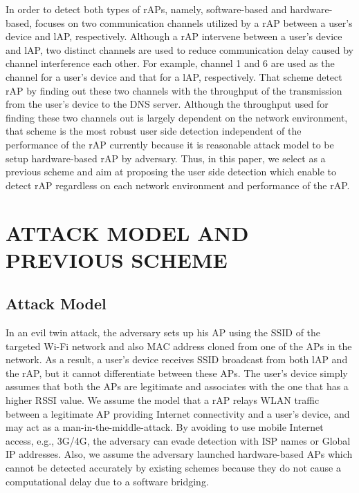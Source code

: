 \documentclass[conference]{IEEEtran}
\begin{document}
In order to detect both types of rAPs, namely, software-based and hardware-based, \cite{previous} focuses on two communication channels utilized by a rAP between a user's device and lAP, respectively.
Although a rAP intervene between a user's device and lAP, two distinct channels are used to reduce communication delay caused by channel interference each other.
For example, channel 1 and 6 are used as the channel for a user's device and that for a lAP, respectively.
That scheme detect rAP by finding out these two channels with the throughput of the transmission from the user's device to the DNS server.
Although the throughput used for finding these two channels out is largely dependent on the network environment, that scheme is the most robust user side detection independent of the performance of the rAP currently because it is reasonable attack model to be setup hardware-based rAP by adversary.
Thus, in this paper, we select \cite{previous} as a previous scheme and aim at proposing the user side detection which enable to detect rAP regardless on each network environment and performance of the rAP.



\section{ATTACK MODEL AND PREVIOUS SCHEME}
\subsection{Attack Model}
In an evil twin attack, the adversary sets up his AP using the SSID of the targeted Wi-Fi network and also MAC address cloned from one of the APs in the network.
As a result, a user's device receives SSID broadcast from both lAP and the rAP, but it cannot differentiate between these APs.
The user's device simply assumes that both the APs are legitimate and associates with the one that has a higher RSSI value.
We assume the model that a rAP relays WLAN traffic between a legitimate AP providing Internet connectivity and a user's device, and may act as a man-in-the-middle-attack.
By avoiding to use mobile Internet access, e.g., 3G/4G, the adversary can evade detection with ISP names or Global IP addresses\cite{rtt}.
Also, we assume the adversary launched hardware-based APs which cannot be detected accurately by existing schemes because they do not cause a computational delay due to a software bridging.
\end{document}
